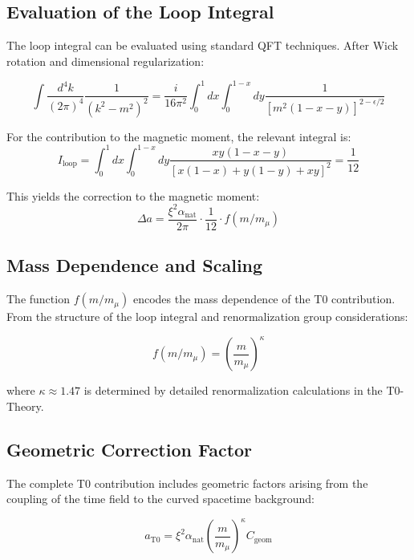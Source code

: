 \documentclass[12pt,a4paper]{article}
\newcommand{\xipar}{\xi}
\newcommand{\alphaNAT}{\alpha_{\text{nat}}}
\newcommand{\Cgeom}{C_{\text{geom}}}
\newcommand{\kappaT}{\kappa}
\newcommand{\mmu}{m_{\mu}}
\begin{document}
	\subsection{Evaluation of the Loop Integral}
	
	The loop integral can be evaluated using standard QFT techniques. After Wick rotation and dimensional regularization:
	
	\begin{equation}
		\int \frac{d^4k}{(2\pi)^4} \frac{1}{(k^2 - m^2)^2} = \frac{i}{16\pi^2} \int_0^1 dx \int_0^{1-x} dy \frac{1}{[m^2(1-x-y)]^{2-\epsilon/2}}
	\end{equation}
	
	For the contribution to the magnetic moment, the relevant integral is:
	\begin{equation}
		I_{\text{loop}} = \int_0^1 dx \int_0^{1-x} dy \frac{xy(1-x-y)}{[x(1-x) + y(1-y) + xy]^2} = \frac{1}{12}
	\end{equation}
	
	This yields the correction to the magnetic moment:
	\begin{equation}
		\Delta a = \frac{\xipar^2 \alphaNAT}{2\pi} \cdot \frac{1}{12} \cdot f(m/\mmu)
	\end{equation}
	
	\subsection{Mass Dependence and Scaling}
	
	The function \( f(m/\mmu) \) encodes the mass dependence of the T0 contribution. From the structure of the loop integral and renormalization group considerations:
	
	\begin{equation}
		f(m/\mmu) = \left(\frac{m}{\mmu}\right)^{\kappaT}
	\end{equation}
	
	where \(\kappaT \approx 1.47\) is determined by detailed renormalization calculations in the T0-Theory.
	
	\subsection{Geometric Correction Factor}
	
	The complete T0 contribution includes geometric factors arising from the coupling of the time field to the curved spacetime background:
	
	\begin{equation}
		a_{\text{T0}} = \xipar^2 \alphaNAT \left(\frac{m}{\mmu}\right)^{\kappaT} \Cgeom
	\end{equation}
	
\end{document}
